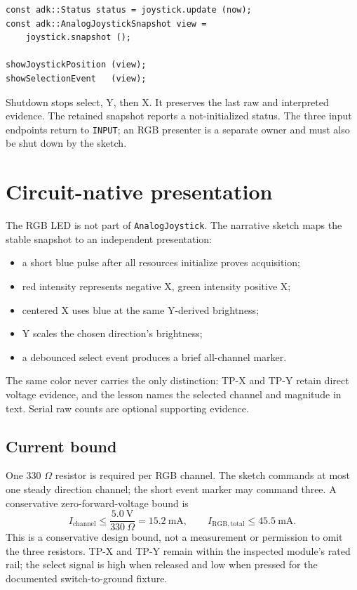 \documentclass[11pt]{article}
\begin{document}
\begin{lstlisting}[style=adkcpp]
const adk::Status status = joystick.update (now);
const adk::AnalogJoystickSnapshot view =
    joystick.snapshot ();

showJoystickPosition (view);
showSelectionEvent   (view);
\end{lstlisting}

Shutdown stops select, Y, then X. It preserves the last raw and interpreted
evidence. The retained snapshot reports a not-initialized status. The three
input endpoints return to \texttt{INPUT}; an RGB presenter is a separate owner
and must also be shut down by the sketch.

\section{Circuit-native presentation}

The RGB LED is not part of \texttt{AnalogJoystick}. The narrative sketch maps
the stable snapshot to an independent presentation:

\begin{itemize}
  \item a short blue pulse after all resources initialize proves acquisition;
  \item red intensity represents negative X, green intensity positive X;
  \item centered X uses blue at the same Y-derived brightness;
  \item Y scales the chosen direction's brightness;
  \item a debounced select event produces a brief all-channel marker.
\end{itemize}

The same color never carries the only distinction: TP-X and TP-Y retain direct
voltage evidence, and the lesson names the selected channel and magnitude in
text. Serial raw counts are optional supporting evidence.

\subsection{Current bound}

One 330 \(\Omega\) resistor is required per RGB channel. The sketch commands at
most one steady direction channel; the short event marker may command three.
A conservative zero-forward-voltage bound is
\[
I_{\mathrm{channel}}\leq\frac{5.0\ \mathrm{V}}{330\ \Omega}=15.2\ \mathrm{mA},
\qquad I_{\mathrm{RGB,total}}\leq45.5\ \mathrm{mA}.
\]
This is a conservative design bound, not a measurement or permission to omit
the three resistors. TP-X and TP-Y remain within the inspected module's rated
rail; the select signal is high when released and low when pressed for the
documented switch-to-ground fixture.
\end{document}
